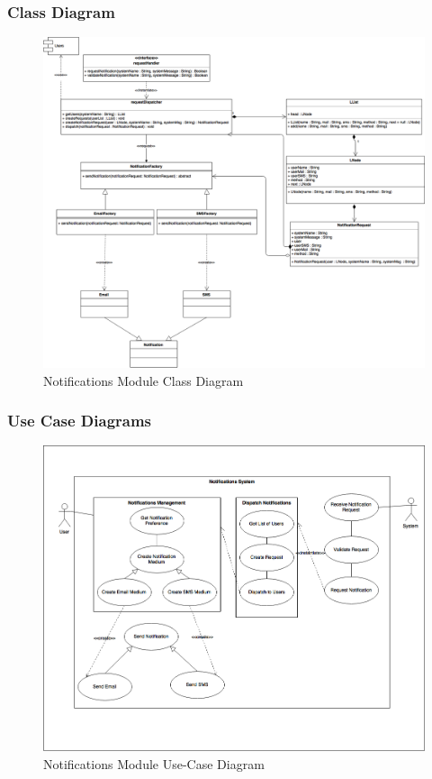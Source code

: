 \documentclass{article}
\begin{document}
        \subsubsection{Class Diagram}
		\begin{figure}[!h]
    			\includegraphics[width=\textwidth]{Notifications_Class_Diagram}
			\caption{Notifications Module Class Diagram}
		\end{figure}
        \subsubsection{Use Case Diagrams}
			\begin{figure}[!h]
    			\includegraphics[width=\textwidth]{NotificationUseCases}
			\caption{Notifications Module Use-Case Diagram}
			\end{figure}
\end{document}
